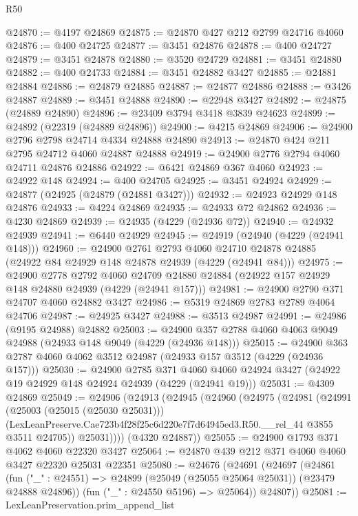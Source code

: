 \begin{lexlean}{R50}
\begin{coremodule}
@24870 := @4197 @24869
@24875 := @24870 @427 @212 @2799 @24716 @4060
@24876 := @400 @24725
@24877 := @3451 @24876
@24878 := @400 @24727
@24879 := @3451 @24878
@24880 := @3520 @24729
@24881 := @3451 @24880
@24882 := @400 @24733
@24884 := @3451 @24882 @3427
@24885 := @24881 @24884
@24886 := @24879 @24885
@24887 := @24877 @24886
@24888 := @3426 @24887
@24889 := @3451 @24888
@24890 := @22948 @3427
@24892 := @24875 (@24889 @24890)
@24896 := @23409 @3794 @3418 @3839 @24623
@24899 := @24892 (@22319 (@24889 @24896))
@24900 := @4215 @24869
@24906 := @24900 @2796 @2798 @24714 @4334 @24888 @24890
@24913 := @24870 @424 @211 @2795 @24712 @4060 @24887 @24888
@24919 := @24900 @2776 @2794 @4060 @24711 @24876 @24886
@24922 := @6421 @24869 @367 @4060
@24923 := @24922 @148
@24924 := @400 @24705
@24925 := @3451 @24924
@24929 := @24877 (@24925 (@24879 (@24881 @3427)))
@24932 := @24923 @24929 @148 @24876
@24933 := @4224 @24869
@24935 := @24933 @72 @24862
@24936 := @4230 @24869
@24939 := @24935 (@4229 (@24936 @72))
@24940 := @24932 @24939
@24941 := @6440 @24929
@24945 := @24919 (@24940 (@4229 (@24941 @148)))
@24960 := @24900
    @2761
    @2793
    @4060
    @24710
    @24878
    @24885
    (@24922 @84 @24929 @148 @24878 @24939 (@4229 (@24941 @84)))
@24975 := @24900
    @2778
    @2792
    @4060
    @24709
    @24880
    @24884
    (@24922 @157 @24929 @148 @24880 @24939 (@4229 (@24941 @157)))
@24981 := @24900 @2790 @371 @24707 @4060 @24882 @3427
@24986 := @5319 @24869 @2783 @2789 @4064 @24706
@24987 := @24925 @3427
@24988 := @3513 @24987
@24991 := @24986 (@9195 @24988) @24882
@25003 := @24900 @357 @2788 @4060 @4063 @9049 @24988 (@24933 @148 @9049 (@4229 (@24936 @148)))
@25015 := @24900 @363 @2787 @4060 @4062 @3512 @24987 (@24933 @157 @3512 (@4229 (@24936 @157)))
@25030 := @24900
    @2785
    @371
    @4060
    @4060
    @24924
    @3427
    (@24922 @19 @24929 @148 @24924 @24939 (@4229 (@24941 @19)))
@25031 := @4309 @24869
@25049 := @24906
    (@24913
      (@24945
        (@24960
          (@24975
            (@24981
              (@24991
                (@25003 (@25015 (@25030 @25031)))
                (LexLeanPreserve.Cae723b4f28f25c6d220e7f7d64945ed3.R50.__rel_44 @3855 @3511 @24705))
              @25031))))
      (@4320 @24887))
@25055 := @24900 @1793 @371 @4062 @4060 @22320 @3427
@25064 := @24870 @439 @212 @371 @4060 @4060 @3427 @22320 @25031 @22351
@25080 := @24676
    (@24691
      (@24697
        (@24861
          (fun ("_" : @24551) => @24899 (@25049 (@25055 @25064 @25031)) (@23479 @24888 @24896))
          (fun ("_" : @24550 @5196) => @25064))
        @24807))
@25081 := LexLeanPreservation.prim_append_list

\end{coremodule}
\end{lexlean}
